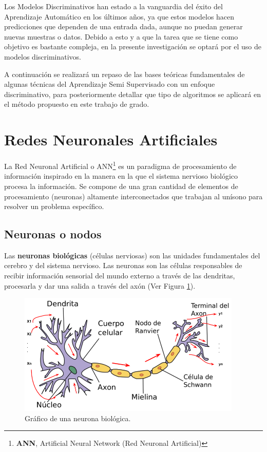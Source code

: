 Los Modelos Discriminativos han estado a la vanguardia del éxito del Aprendizaje Automático en los \'{u}ltimos a\~{n}os, ya que estos modelos hacen predicciones que dependen de una entrada dada, aunque no puedan generar nuevas muestras o datos. Debido a esto y a que la tarea que se tiene como objetivo es bastante compleja, en la presente investigaci\'{o}n se optar\'{a} por el uso de modelos discriminativos. 

\vspace{5mm} %

A continuaci\'{o}n se realizar\'{a} un repaso de las bases te\'{o}ricas fundamentales de algunas t\'{e}cnicas del Aprendizaje Semi Supervisado con un enfoque discriminativo, para posteriormente detallar que tipo de algoritmos se aplicar\'{a} en el m\'{e}todo propuesto en este trabajo de grado.

\section{Redes Neuronales Artificiales}

La Red Neuronal Artificial o ANN\footnote{\textbf{ANN}, Artificial Neural Network (Red Neuronal Artificial)} es un paradigma de procesamiento de informaci\'{o}n inspirado en la manera en la que el sistema nervioso biol\'{o}gico procesa la informaci\'{o}n. Se compone de una gran cantidad de elementos de procesamiento (neuronas) altamente interconectados que trabajan al un\'{i}sono para resolver un problema espec\'{i}fico.

\subsection{Neuronas o nodos}

Las \textbf{neuronas biol\'{o}gicas} (c\'{e}lulas nerviosas) son las unidades fundamentales del cerebro y del sistema nervioso. Las neuronas son las c\'{e}lulas responsables de recibir informaci\'{o}n sensorial del mundo externo a trav\'{e}s de las dendritas, procesarla y dar una salida a trav\'{e}s del ax\'{o}n (Ver Figura \ref{fig:neurona}). 

 \begin{figure}[h!]
  \begin{center}	\includegraphics[width=0.95\textwidth]{imagenes/Cap4/neurona}
  \caption{Gr\'{a}fico de una neurona biol\'{o}gica.}
  \label{fig:neurona}
  \end{center}
\end{figure}

